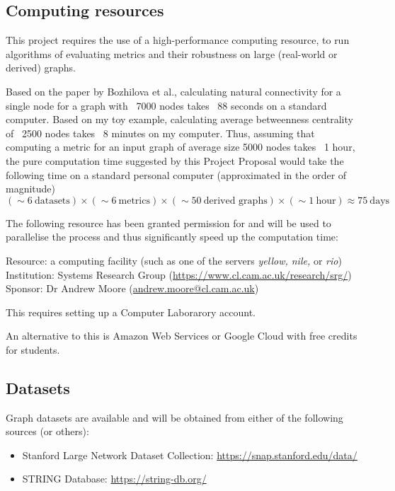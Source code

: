 \subsection*{Computing resources}

This project requires the use of a high-performance computing resource, to run algorithms of evaluating metrics and their robustness on large (real-world or derived) graphs.

Based on the paper by Bozhilova et al., calculating natural connectivity for a single node for a graph with ~7000 nodes takes ~88 seconds on a standard computer. Based on my toy example, calculating average betweenness centrality of ~2500 nodes takes ~8 minutes on my computer. Thus, assuming that computing a metric for an input graph of average size 5000 nodes takes ~1 hour, the pure computation time suggested by this Project Proposal would take the following time on a standard personal computer (approximated in the order of magnitude)
\[(\sim 6\ \text{datasets}) \times (\sim 6\ \text{metrics}) \times (\sim 50\ \text{derived graphs}) \times (\sim 1\ \text{hour}) \approx 75\ \text{days}\]

The following resource has been granted permission for and will be used to parallelise the process and thus significantly speed up the computation time:

\begin{adjustwidth}{1cm}{}
    Resource: a computing facility (such as one of the servers \textit{yellow, nile,} or \textit{rio})\\
    Institution: Systems Research Group (\url{https://www.cl.cam.ac.uk/research/srg/})\\
    Sponsor: Dr Andrew Moore (\url{andrew.moore@cl.cam.ac.uk})

    This requires setting up a Computer Laborarory account.
\end{adjustwidth}

An alternative to this is Amazon Web Services or Google Cloud with free credits for students.

\subsection*{Datasets}

Graph datasets are available and will be obtained from either of the following sources (or others):

\begin{itemize}
    \item Stanford Large Network Dataset Collection: \url{https://snap.stanford.edu/data/}
    \item STRING Database: \url{https://string-db.org/}
\end{itemize}
